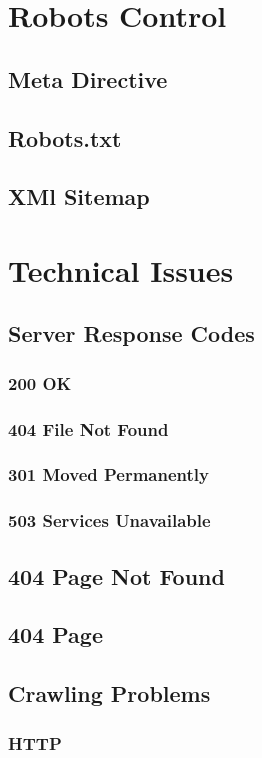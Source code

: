 \documentclass[fleqn,10pt]{SelfArx} %
\begin{document}
\section{Robots Control}
\subsection{Meta Directive}
\subsection{Robots.txt}
\subsection{XMl Sitemap}

\section{Technical Issues}
\subsection{Server Response Codes}
\subsubsection{200 OK}
\subsubsection{404 File Not Found}
\subsubsection{301 Moved Permanently}
\subsubsection{503 Services Unavailable}
\subsection{404 Page Not Found}
\subsection{404 Page }
\subsection{Crawling Problems}
\subsubsection{HTTP}
\end{document}
